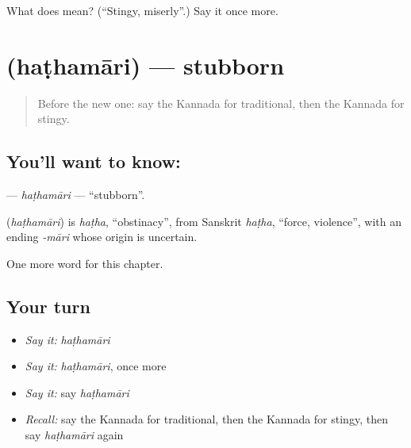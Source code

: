 \begin{tcolorbox}[breakable,colback=teal!4,colframe=teal!35!black,title={Before you move on}]
What does  mean? (\textquotedblleft{}Stingy, miserly\textquotedblright{}.) Say it once more.
\end{tcolorbox}
\section[\texorpdfstring{\kn{ಹಠಮಾರಿ} (haṭhamāri)}{ಹಠಮಾರಿ (haṭhamāri)}]{ (haṭhamāri) — stubborn}

\label{lesson:KA-C182-hathamari}



\begin{quote}
Before the new one: say the Kannada for traditional, then the Kannada for stingy.
\end{quote}

\subsection*{You'll want to know: }
\textbf{} — \emph{haṭhamāri} — \textquotedblleft{}stubborn\textquotedblright{}.

\begin{cousinweb}
\textbf{} (\emph{haṭhamāri}) is \emph{haṭha}, \textquotedblleft{}obstinacy\textquotedblright{}, from Sanskrit \emph{haṭha}, \textquotedblleft{}force, violence\textquotedblright{}, with an ending \emph{-māri} whose origin is uncertain.
\end{cousinweb}

\begin{grammarlens}[title={What you've built}]
One more word for this chapter.
\end{grammarlens}

\subsection*{Your turn}
\begin{itemize}
\raggedright
  \item \emph{Say it:} \emph{haṭhamāri}
  \item \emph{Say it:} \emph{haṭhamāri}, once more
  \item \emph{Say it:} say \emph{haṭhamāri}
  \item \emph{Recall:} say the Kannada for traditional, then the Kannada for stingy, then say \emph{haṭhamāri} again
\end{itemize}

